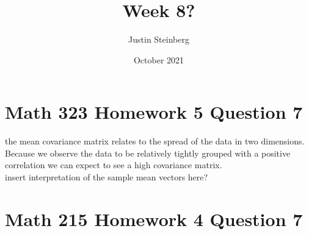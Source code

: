 \documentclass{article}
\title{Week 8?}
\author{Justin Steinberg}
\date{October 2021}
\begin{document}
\maketitle

\section{Math 323 Homework 5 Question 7}

\begin{center}
    the mean covariance matrix relates to the spread of the data in two dimensions. Because we observe the 
    data to be relatively tightly grouped with a positive correlation we can expect to see a high 
    covariance matrix. \\insert interpretation of the sample mean vectors here?
\end{center}

\section{Math 215 Homework 4 Question 7}

\end{document}
